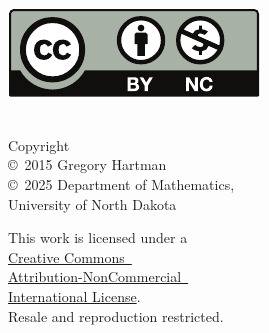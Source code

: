 \noindent
\begin{minipage}[t]{\cellwidth}\mbox{}\\
\href{http://creativecommons.org/licenses/by-nc/4.0/}{\includegraphics[alt={Creative Commons by-nc license}]{figures/raw/by-nc}}
\end{minipage}%
\begin{minipage}[t]{.5\linewidth}\raggedright\mbox{}\\
\noindent Copyright\\
\copyright~2015 Gregory Hartman\\
\copyright~2025 Department of Mathematics,\\
University of North Dakota\medskip

\noindent
This work is licensed under a\iflatexml\ \else\\\fi
\href{http://creativecommons.org/licenses/by-nc/4.0/}{Creative Commons\iflatexml\ \else\\\fi
Attribution-NonCommercial\iflatexml\ \else\\ International License}.\\
Resale and reproduction restricted.
\end{minipage}

\endgroup

\restoregeometry

